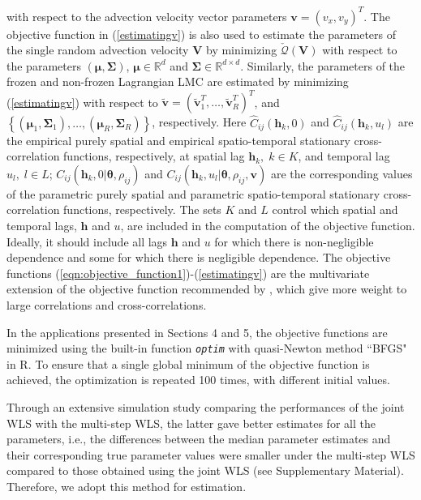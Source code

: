 \documentclass[12pt]{article}
\newcommand{\0}{\mathbf{0}}
\begin{document}
with respect to the advection velocity vector parameters $\mathbf{v}=(v_x,v_y)^T$. The objective function in (\ref{estimatingv}) is also used to estimate the parameters of the single random advection velocity $\mathbf{V}$ by minimizing $\check{\mathcal{Q}}(\mathbf{V})$ with respect to the parameters $\left(\boldsymbol{\mu},\boldsymbol{\Sigma}\right)$, $\boldsymbol{\mu}\in  \mathbb{R}^d$ and $\boldsymbol{\Sigma}\in  \mathbb{R}^{d\times d}$. Similarly, the parameters of the frozen and non-frozen Lagrangian LMC are estimated by minimizing (\ref{estimatingv}) with respect to $\tilde{\mathbf{v}}=\left(\tilde{\mathbf{v}}_1^T,\ldots,\tilde{\mathbf{v}}_R^T\right)^T$, and $\left\{\left(\boldsymbol{\mu}_1,\boldsymbol{\Sigma}_1\right),\ldots, \left(\boldsymbol{\mu}_R,\boldsymbol{\Sigma}_R\right)\right\}$, respectively. Here $\widehat{C}_{ij}(\mathbf{h}_k,0)$ and $\widehat{C}_{ij}(\mathbf{h}_k,u_l)$ are the empirical purely spatial and empirical spatio-temporal stationary cross-correlation functions, respectively, at spatial lag $\mathbf{h}_k,\; k \in K$, and temporal lag $u_l,\; l \in L$; $C_{ij}(\mathbf{h}_k,0|\boldsymbol{\theta}, \rho_{ij})$ and $C_{ij}(\mathbf{h}_k,u_l|\boldsymbol{\theta}, \rho_{ij}, \mathbf{v})$ are the corresponding values of the parametric purely spatial and parametric spatio-temporal stationary cross-correlation functions, respectively. The sets $K$ and $L$ control which spatial and temporal lags, $\mathbf{h}$ and $u$, are included in the computation of the objective function. Ideally, it should include all lags $\mathbf{h}$ and $u$ for which there is non-negligible dependence and some for which there is negligible dependence. The objective functions (\ref{eqn:objective_function1})-(\ref{estimatingv}) are the multivariate extension of the objective function recommended by \citet{gneiting2002}, which give more weight to large correlations and cross-correlations. 

In the applications presented in Sections 4 and 5, the objective functions are minimized using the built-in function \emph{\tt optim} with quasi-Newton method ``BFGS" in \textsf{R}. To ensure that a single global minimum of the objective function is achieved, the optimization is repeated 100 times, with different initial values. 

Through an extensive simulation study comparing the performances of the joint WLS with the multi-step WLS, the latter gave better estimates for all the parameters, i.e., the differences between the median parameter estimates and their corresponding true parameter values were smaller under the multi-step WLS compared to those obtained using the joint WLS (see Supplementary Material). Therefore, we adopt this method for estimation.
\end{document}
